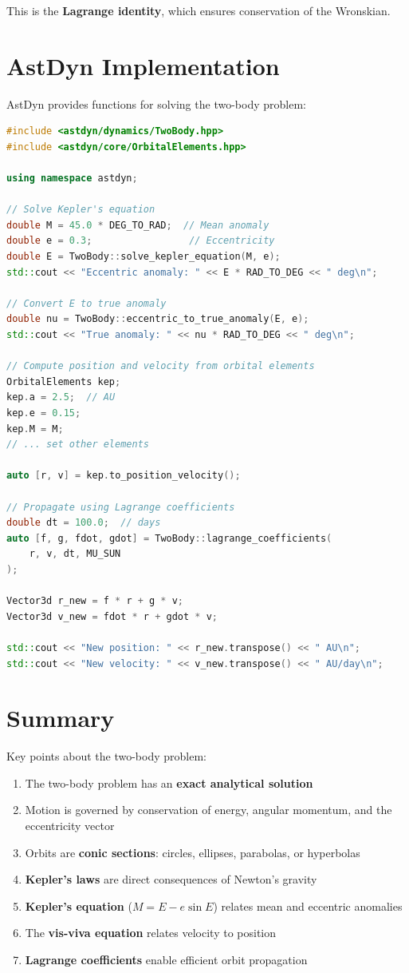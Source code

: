 This is the \textbf{Lagrange identity}, which ensures conservation of the Wronskian.

\section{AstDyn Implementation}

AstDyn provides functions for solving the two-body problem:

\begin{lstlisting}[language=C++,caption={Two-body problem in AstDyn}]
#include <astdyn/dynamics/TwoBody.hpp>
#include <astdyn/core/OrbitalElements.hpp>

using namespace astdyn;

// Solve Kepler's equation
double M = 45.0 * DEG_TO_RAD;  // Mean anomaly
double e = 0.3;                 // Eccentricity
double E = TwoBody::solve_kepler_equation(M, e);
std::cout << "Eccentric anomaly: " << E * RAD_TO_DEG << " deg\n";

// Convert E to true anomaly
double nu = TwoBody::eccentric_to_true_anomaly(E, e);
std::cout << "True anomaly: " << nu * RAD_TO_DEG << " deg\n";

// Compute position and velocity from orbital elements
OrbitalElements kep;
kep.a = 2.5;  // AU
kep.e = 0.15;
kep.M = M;
// ... set other elements

auto [r, v] = kep.to_position_velocity();

// Propagate using Lagrange coefficients
double dt = 100.0;  // days
auto [f, g, fdot, gdot] = TwoBody::lagrange_coefficients(
    r, v, dt, MU_SUN
);

Vector3d r_new = f * r + g * v;
Vector3d v_new = fdot * r + gdot * v;

std::cout << "New position: " << r_new.transpose() << " AU\n";
std::cout << "New velocity: " << v_new.transpose() << " AU/day\n";
\end{lstlisting}

\section{Summary}

Key points about the two-body problem:

\begin{enumerate}
    \item The two-body problem has an \textbf{exact analytical solution}
    \item Motion is governed by conservation of energy, angular momentum, and the eccentricity vector
    \item Orbits are \textbf{conic sections}: circles, ellipses, parabolas, or hyperbolas
    \item \textbf{Kepler's laws} are direct consequences of Newton's gravity
    \item \textbf{Kepler's equation} ($M = E - e\sin E$) relates mean and eccentric anomalies
    \item The \textbf{vis-viva equation} relates velocity to position
    \item \textbf{Lagrange coefficients} enable efficient orbit propagation
\end{enumerate}

